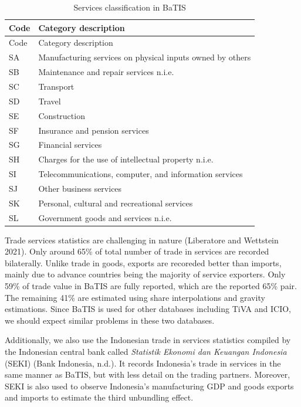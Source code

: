 \documentclass[
  letterpaper,
  DIV=11,
  numbers=noendperiod]{scrartcl}
\begin{document}
\begin{longtable}[]{@{}ll@{}}
\caption{Services classification in BaTIS}\label{tbl-1}\tabularnewline
\toprule\noalign{}
Code & Category description \\
\midrule\noalign{}
\endfirsthead
\toprule\noalign{}
Code & Category description \\
\midrule\noalign{}
\endhead
\bottomrule\noalign{}
\endlastfoot
SA & Manufacturing services on physical inputs owned by others \\
SB & Maintenance and repair services n.i.e. \\
SC & Transport \\
SD & Travel \\
SE & Construction \\
SF & Insurance and pension services \\
SG & Financial services \\
SH & Charges for the use of intellectual property n.i.e. \\
SI & Telecommunications, computer, and information services \\
SJ & Other business services \\
SK & Personal, cultural and recreational services \\
SL & Government goods and services n.i.e. \\
\end{longtable}

Trade services statistics are challenging in nature (Liberatore and
Wettstein 2021). Only around 65\% of total number of trade in services
are recorded bilaterally. Unlike trade in goods, exports are recoreded
better than imports, mainly due to advance countries being the majority
of service exporters. Only 59\% of trade value in BaTIS are fully
reported, which are the reported 65\% pair. The remaining 41\% are
estimated using share interpolations and gravity estimations. Since
BaTIS is used for other databases including TiVA and ICIO, we should
expect similar problems in these two databases.

Additionally, we also use the Indonesian trade in services statistics
compiled by the Indonesian central bank called \emph{Statistik Ekonomi
dan Keuangan Indonesia} (SEKI) (Bank Indonesia, n.d.). It records
Indonesia's trade in services in the same manner as BaTIS, but with less
detail on the trading partners. Moreover, SEKI is also used to observe
Indonesia's manufacturing GDP and goods exports and imports to estimate
the third unbundling effect.
\end{document}
